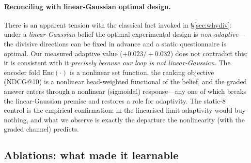 \documentclass[11pt]{article}
\begin{document}
\paragraph{Reconciling with linear-Gaussian optimal design.} There is an apparent tension with the classical fact
invoked in \S\ref{sec:whydiv}: under a \emph{linear-Gaussian} belief the optimal experimental design is
\emph{non-adaptive}---the divisive directions can be fixed in advance and a static questionnaire is optimal. Our measured
adaptive value ($+0.023/+0.032$) does not contradict this; it is consistent with it \emph{precisely because our loop is
not linear-Gaussian}. The encoder fold $\mathrm{Enc}(\cdot)$ is a nonlinear set function, the ranking objective
(NDCG@10) is a nonlinear head-weighted functional of the belief, and the graded answer enters through a nonlinear
(sigmoidal) response---any one of which breaks the linear-Gaussian premise and restores a role for adaptivity. The
static-8 control is the empirical confirmation: in the linearised limit adaptivity would buy nothing, and what we observe
is exactly the departure the nonlinearity (with the graded channel) predicts.

\subsection{Ablations: what made it learnable}\label{sec:ablations}
\end{document}
